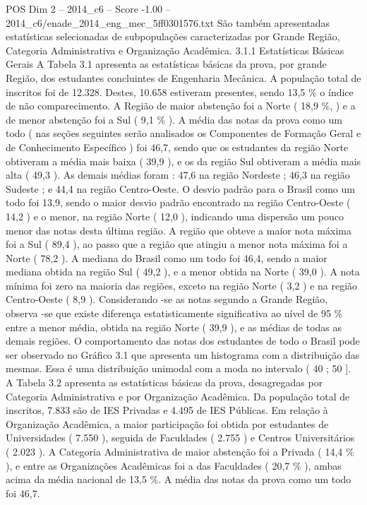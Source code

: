 \begin{textsample}{POS Dim 2 – 2014\_c6 – Score -1.00 – 2014\_c6/enade\_2014\_eng\_mec\_5ff0301576.txt}
São também apresentadas estatísticas selecionadas de subpopulações caracterizadas por Grande Região, Categoria Administrativa e Organização Acadêmica. 3.1.1 Estatísticas Básicas Gerais A Tabela 3.1 apresenta as estatísticas básicas da prova, por grande Região, dos estudantes concluintes de Engenharia Mecânica.
A população total de inscritos foi de 12.328.
Destes, 10.658 estiveram presentes, sendo 13,5 \% o índice de não comparecimento.
A Região de maior abstenção foi a Norte ( 18,9 \%, ) e a de menor abstenção foi a Sul ( 9,1 \% ).
A média das notas da prova como um todo ( nas seções seguintes serão analisados os Componentes de Formação Geral e de Conhecimento Específico ) foi 46,7, sendo que os estudantes da região Norte obtiveram a média mais baixa ( 39,9 ), e os da região Sul obtiveram a média mais alta ( 49,3 ).
As demais médias foram : 47,6 na região Nordeste ; 46,3 na região Sudeste ; e 44,4 na região Centro-Oeste.
O desvio padrão para o Brasil como um todo foi 13,9, sendo o maior desvio padrão encontrado na região Centro-Oeste ( 14,2 ) e o menor, na região Norte ( 12,0 ), indicando uma dispersão um pouco menor das notas desta última região.
A região que obteve a maior nota máxima foi a Sul ( 89,4 ), ao passo que a região que atingiu a menor nota máxima foi a Norte ( 78,2 ).
A mediana do Brasil como um todo foi 46,4, sendo a maior mediana obtida na região Sul ( 49,2 ), e a menor obtida na Norte ( 39,0 ).
A nota mínima foi zero na maioria das regiões, exceto na região Norte ( 3,2 ) e na região Centro-Oeste ( 8,9 ).
Considerando -se as notas segundo a Grande Região, observa -se que existe diferença estatisticamente significativa ao nível de 95 \% entre a menor média, obtida na região Norte ( 39,9 ), e as médias de todas as demais regiões.
O comportamento das notas dos estudantes de todo o Brasil pode ser observado no Gráfico 3.1 que apresenta um histograma com a distribuição das mesmas.
Essa é uma distribuição unimodal com a moda no intervalo ( 40 ; 50 ].
A Tabela 3.2 apresenta as estatísticas básicas da prova, desagregadas por Categoria Administrativa e por Organização Acadêmica.
Da população total de inscritos, 7.833 são de IES Privadas e 4.495 de IES Públicas.
Em relação à Organização Acadêmica, a maior participação foi obtida por estudantes de Universidades ( 7.550 ), seguida de Faculdades ( 2.755 ) e Centros Universitários ( 2.023 ).
A Categoria Administrativa de maior abstenção foi a Privada ( 14,4 \% ), e entre as Organizações Acadêmicas foi a das Faculdades ( 20,7 \% ), ambas acima da média nacional de 13,5 \%.
A média das notas da prova como um todo foi 46,7.

\end{textsample}
